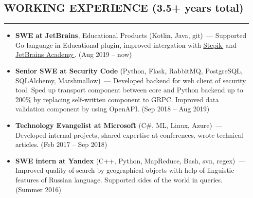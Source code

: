 \documentclass[11pt]{res} %
\let\orighref\href
\renewcommand{\href}[2]{\orighref{#1}{#2\,\faExternalLink}}
\begin{document}
\begin{resume}
\section{\uppercase{Working Experience} (3.5+ years total)}
\begin{spacing}{0.3}
\textcolor[RGB]{220,220,220}{\rule{\linewidth}{0.4pt}} 
\end{spacing}
\vspace{0.2in}
   \begin{itemize} \itemsep -2pt  %
    \item \textbf{SWE at JetBrains}, Educational Products (Kotlin, Java, git)~--- Supported Go language in Educational plugin, improved intergation with \href{https://stepik.org/}{Stepik} and \href{https://hyperskill.org}{JetBrains Academy}. (Aug 2019 – now)
   \item {\textbf{Senior SWE at Security Code}} (Python, Flask, RabbitMQ, PostgreSQL, SQLAlchemy, Marshmallow)~--- Developed backend for web client of security tool. Sped up transport component between core and Python backend up to 200\% by replacing self-written component to GRPC. Improved data validation component by using OpenAPI. (Sep 2018 – Aug 2019)
   \item {\textbf{Technology Evangelist at Microsoft}} (C\#, ML, Linux, Azure)~--- Developed internal projects, shared expertise at conferences, wrote technical articles. (Feb 2017 – Sep 2018)
   \item {\textbf{SWE intern at Yandex}} (C++, Python, MapReduce, Bash, svn, regex)~--- Improved quality of search by geographical objects with help of linguistic features of Russian language. Supported sides of the world in queries. (Summer 2016)
 \end{itemize}


\end{resume}
\end{document}
